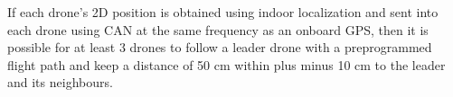 If each drone’s 2D position is obtained using indoor localization and sent into each drone using CAN at the same frequency as an onboard GPS, then it is possible for at least 3 drones to follow a leader drone with a preprogrammed flight path and keep a distance of 50 cm within plus minus 10 cm to the leader and its neighbours.